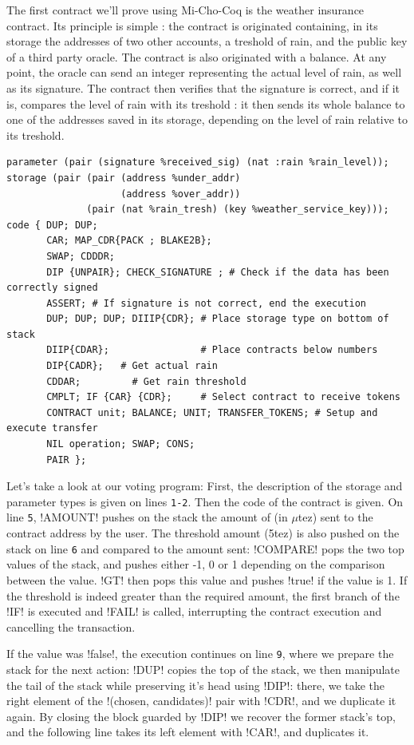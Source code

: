 \documentclass{report}
\begin{document}
The first contract we'll prove using Mi-Cho-Coq is the weather insurance contract. Its principle is simple : the contract is originated containing, in its storage the addresses of two other accounts, a treshold of rain, and the public key of a third party oracle. The contract is also originated with a balance. At any point, the oracle can send an integer representing the actual level of rain, as well as its signature. The contract then verifies that the signature is correct, and if it is, compares the level of rain with its treshold : it then sends its whole balance to one of the addresses saved in its storage, depending on the level of rain relative to its treshold.


\begin{lstlisting}[language=michelson]
parameter (pair (signature %received_sig) (nat :rain %rain_level));
storage (pair (pair (address %under_addr)
                    (address %over_addr))
              (pair (nat %rain_tresh) (key %weather_service_key)));
code { DUP; DUP;
       CAR; MAP_CDR{PACK ; BLAKE2B};
       SWAP; CDDDR;
       DIP {UNPAIR}; CHECK_SIGNATURE ; # Check if the data has been correctly signed
       ASSERT; # If signature is not correct, end the execution
       DUP; DUP; DUP; DIIIP{CDR}; # Place storage type on bottom of stack
       DIIP{CDAR};                # Place contracts below numbers
       DIP{CADR};   # Get actual rain
       CDDAR;         # Get rain threshold
       CMPLT; IF {CAR} {CDR};     # Select contract to receive tokens
       CONTRACT unit; BALANCE; UNIT; TRANSFER_TOKENS; # Setup and execute transfer
       NIL operation; SWAP; CONS;
       PAIR };
\end{lstlisting}

Let's take a look at our voting program: First, the description of the
storage and parameter types is given on lines \texttt{1-2}.  Then the
code of the contract is given.
On line \texttt{5}, !AMOUNT! pushes on the stack the amount
of (in $\mu$tez) sent to the contract address by the user. The threshold amount
(5tez) is also pushed on the stack on line \texttt{6} and compared to
the amount sent:
!COMPARE! pops the two top values of the stack, and pushes
either -1, 0 or 1 depending on the comparison between the
value. !GT! then pops this value and pushes !true!
if the value is 1. If the threshold is indeed greater than the
required amount, the first branch of the !IF! is executed
and !FAIL! is called, interrupting the contract execution
and cancelling the transaction.

If the value was !false!, the execution continues on line
\texttt{9}, where we prepare the stack for the next action:
!DUP! copies the top of the stack, we then manipulate the
tail of the stack while preserving it's head using !DIP!:
there, we take the right element of the !(chosen, candidates)! pair
with !CDR!, and we duplicate it again.  By closing the block
guarded by !DIP! we recover the former stack's top, and the following
line takes its left element with !CAR!, and duplicates it.
\end{document}
